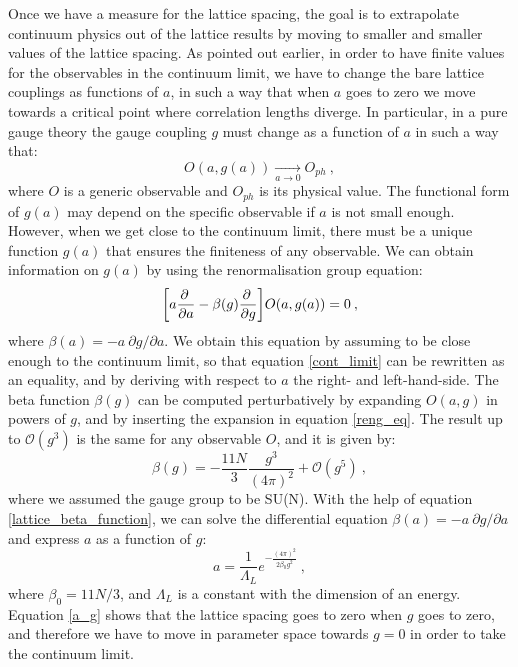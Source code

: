 Once we have a measure for the lattice spacing, the goal is to extrapolate continuum physics out of the lattice results by moving to smaller and smaller values of the lattice spacing. As pointed out earlier, in order to have finite values for the observables in the continuum limit, we have to change the bare lattice couplings as functions of $a$, in such a way that when $a$ goes to zero we move towards a critical point where correlation lengths diverge. In particular, in a pure gauge theory the gauge coupling $g$ must change as a function of $a$ in such a way that:
\begin{equation}
O(a,g(a)) \underset{a \to 0}{\longrightarrow} O_{ph} \: ,
\label{cont_limit}
\end{equation}
%
where $O$ is a generic observable and $O_{ph}$ is its physical value. The functional form of $g(a)$ may depend on the specific observable if $a$ is not small enough. However, when we get close to the continuum limit, there must be a unique function $g(a)$ that ensures the finiteness of any observable. We can obtain information on $g(a)$ by using the renormalisation group equation:
\begin{equation}
\biggl[ a\frac{\partial \:}{\partial a} - \beta(g) \frac{\partial \:}{\partial g} \biggr] O(a,g(a)) = 0 \: ,
\label{reng_eq}
\end{equation}
%
where $\beta(a) = - a \: \partial g/ \partial a$. We obtain this equation by assuming to be close enough to the continuum limit, so that equation \ref{cont_limit} can be rewritten as an equality, and by deriving with respect to $a$ the right- and left-hand-side. The beta function $\beta(g)$ can be computed perturbatively by expanding $O(a,g)$ in powers of $g$, and by inserting the expansion in equation \ref{reng_eq}. The result up to $\mathcal O(g^3)$ is the same for any observable $O$, and it is given by:
\begin{equation}
 \beta(g) = - \frac{11 N}{3} \frac{g^3}{(4 \pi)^2} + \mathcal O (g^5) \: ,
\label{lattice_beta_function}
\end{equation}
%
where we assumed the gauge group to be SU(N). With the help of equation \ref{lattice_beta_function}, we can solve the differential equation $\beta(a) = - a \: \partial g/ \partial a$ and express $a$ as a function of $g$:
\begin{equation}
a = \frac{1}{\Lambda_L} e^{-\frac{(4\pi)^2}{2 \beta_0 g^2}} \: ,
\label{a_g}
\end{equation}
%
where $\beta_0 = 11 N/3$, and $\Lambda_L$ is a constant with the dimension of an energy. Equation \ref{a_g} shows that the lattice spacing goes to zero when $g$ goes to zero, and therefore we have to move in parameter space towards $g=0$ in order to take the continuum limit.

